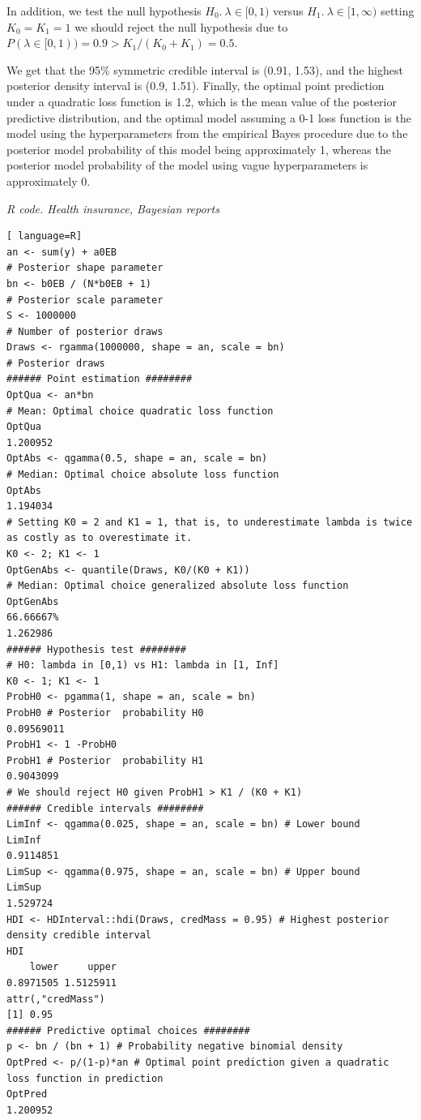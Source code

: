 In addition, we test the null hypothesis $H_0. \ \lambda \in [0,1)$ versus $H_1. \ \lambda \in [1,\infty)$ setting $K_0=K_1=1$ we should reject the null hypothesis due to $P(\lambda \in [0,1))=0.9>K_1/(K_0+K_1)=0.5$.

We get that the 95\% symmetric credible interval is (0.91, 1.53), and the highest posterior density interval is (0.9, 1.51). Finally, the optimal point prediction under a quadratic loss function is 1.2, which is the mean value of the posterior predictive distribution, and the optimal model assuming a 0-1 loss function is the model using the hyperparameters from the empirical Bayes procedure due to the posterior model probability of this model being approximately 1, whereas the posterior model probability of the model using vague hyperparameters is approximately 0.

\begin{tcolorbox}[enhanced,width=4.67in,center upper,
	fontupper=\large\bfseries,drop shadow southwest,sharp corners]
	\textit{R code. Health insurance, Bayesian reports}
\begin{VF}
\begin{lstlisting}[ language=R]
an <- sum(y) + a0EB 
# Posterior shape parameter
bn <- b0EB / (N*b0EB + 1) 
# Posterior scale parameter
S <- 1000000 
# Number of posterior draws
Draws <- rgamma(1000000, shape = an, scale = bn) 
# Posterior draws
###### Point estimation ########
OptQua <- an*bn 
# Mean: Optimal choice quadratic loss function
OptQua
1.200952
OptAbs <- qgamma(0.5, shape = an, scale = bn) 
# Median: Optimal choice absolute loss function
OptAbs
1.194034
# Setting K0 = 2 and K1 = 1, that is, to underestimate lambda is twice as costly as to overestimate it.
K0 <- 2; K1 <- 1
OptGenAbs <- quantile(Draws, K0/(K0 + K1)) 
# Median: Optimal choice generalized absolute loss function
OptGenAbs
66.66667% 
1.262986 
###### Hypothesis test ########
# H0: lambda in [0,1) vs H1: lambda in [1, Inf]
K0 <- 1; K1 <- 1
ProbH0 <- pgamma(1, shape = an, scale = bn) 
ProbH0 # Posterior  probability H0
0.09569011
ProbH1 <- 1 -ProbH0
ProbH1 # Posterior  probability H1
0.9043099
# We should reject H0 given ProbH1 > K1 / (K0 + K1) 
###### Credible intervals ########
LimInf <- qgamma(0.025, shape = an, scale = bn) # Lower bound
LimInf
0.9114851
LimSup <- qgamma(0.975, shape = an, scale = bn) # Upper bound
LimSup
1.529724
HDI <- HDInterval::hdi(Draws, credMass = 0.95) # Highest posterior density credible interval
HDI
    lower     upper 
0.8971505 1.5125911 
attr(,"credMass")
[1] 0.95
###### Predictive optimal choices ########
p <- bn / (bn + 1) # Probability negative binomial density
OptPred <- p/(1-p)*an # Optimal point prediction given a quadratic loss function in prediction
OptPred
1.200952
\end{lstlisting}
\end{VF}
\end{tcolorbox}

